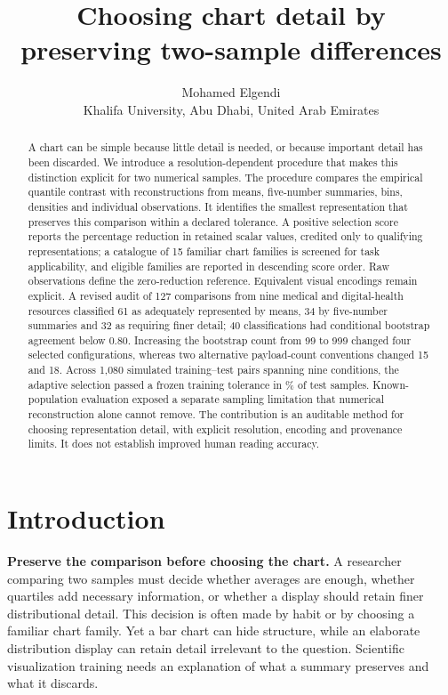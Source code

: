 \documentclass[11pt]{article}
\title{Choosing chart detail by preserving two-sample differences}
\author{Mohamed Elgendi\\Khalifa University, Abu Dhabi, United Arab Emirates}
\date{}
\begin{document}
\maketitle
\begin{abstract}
A chart can be simple because little detail is needed, or because important detail has been discarded. We introduce a resolution-dependent procedure that makes this distinction explicit for two numerical samples. The procedure compares the empirical quantile contrast with reconstructions from means, five-number summaries, bins, densities and individual observations. It identifies the smallest representation that preserves this comparison within a declared tolerance. A positive selection score reports the percentage reduction in retained scalar values, credited only to qualifying representations; a catalogue of 15 familiar chart families is screened for task applicability, and eligible families are reported in descending score order. Raw observations define the zero-reduction reference. Equivalent visual encodings remain explicit. A revised audit of 127 comparisons from nine medical and digital-health resources classified 61 as adequately represented by means, 34 by five-number summaries and 32 as requiring finer detail; 40 classifications had conditional bootstrap agreement below 0.80. Increasing the bootstrap count from 99 to 999 changed four selected configurations, whereas two alternative payload-count conventions changed 15 and 18. Across 1,080 simulated training--test pairs spanning nine conditions, the adaptive selection passed a frozen training tolerance in \FrozenPass\% of test samples. Known-population evaluation exposed a separate sampling limitation that numerical reconstruction alone cannot remove. The contribution is an auditable method for choosing representation detail, with explicit resolution, encoding and provenance limits. It does not establish improved human reading accuracy.
\end{abstract}

\section*{Introduction}
\textbf{Preserve the comparison before choosing the chart.} A researcher comparing two samples must decide whether averages are enough, whether quartiles add necessary information, or whether a display should retain finer distributional detail. This decision is often made by habit or by choosing a familiar chart family. Yet a bar chart can hide structure, while an elaborate distribution display can retain detail irrelevant to the question.\cite{weissgerber2015} Scientific visualization training needs an explanation of what a summary preserves and what it discards.\cite{elgendi2017,elgendi2020}
\end{document}
